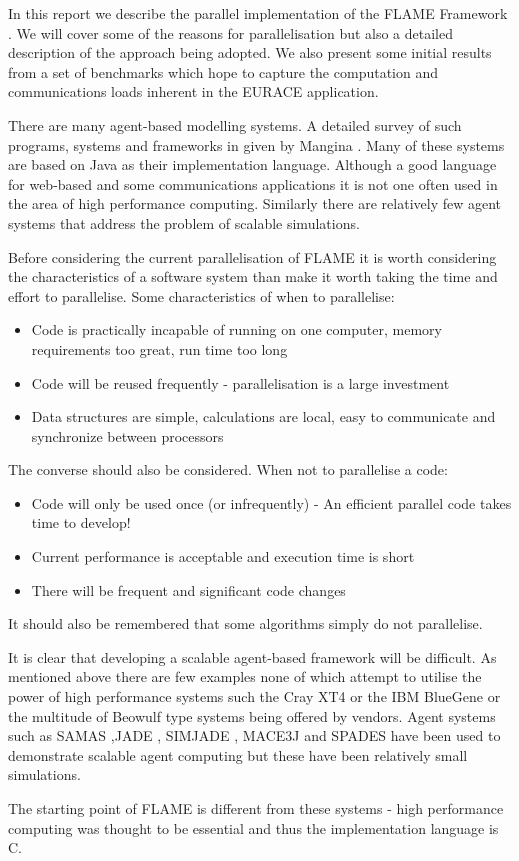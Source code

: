 In this report we describe the parallel implementation of the FLAME Framework \cite{Coakley}. We will cover some of the reasons for parallelisation but also a detailed description of the approach being adopted. We also present some initial results from a set of benchmarks which hope to capture the computation and communications loads inherent in the EURACE application.

There are many agent-based modelling systems. A detailed survey of such programs, systems and frameworks in given by Mangina \cite{Mangina}. Many of these systems are based on Java as their implementation language. Although a good language for web-based and some communications applications it is not one often used in the area of high performance computing. Similarly there are relatively few agent systems that address the problem of scalable simulations.

Before considering the current parallelisation of FLAME it is worth considering the characteristics of a software system than make it worth taking the time and effort to parallelise. Some characteristics of when to parallelise:
\begin{itemize}
\item Code is practically incapable of running on one computer, memory requirements too great, run time too long
\item Code will be reused frequently - parallelisation is a large investment
\item Data structures are simple, calculations are local, easy to communicate and synchronize between processors
\end{itemize}
The converse should also be considered. When not to parallelise a code:
\begin{itemize}
\item Code will only be used once (or infrequently) - An efficient parallel code takes time to develop!
\item Current performance is acceptable and execution time is short
\item There will be frequent and significant code changes
\end{itemize}
It should also be remembered that some algorithms simply do not parallelise.

It is clear that developing a scalable agent-based framework will be difficult. As mentioned above there are few examples none of which attempt to utilise the power of high performance systems such the Cray XT4 or the IBM BlueGene or the multitude of Beowulf type systems being offered by vendors. Agent systems such as SAMAS \cite{SAMAS},JADE \cite {JADE}, SIMJADE \cite{SIMJADE}, MACE3J \cite{MACE3J} and SPADES \cite{SPADES} have been used to demonstrate scalable agent computing but these have been relatively small simulations.

The starting point of FLAME is different from these systems - high performance computing was thought to be essential and thus the implementation language is C.
